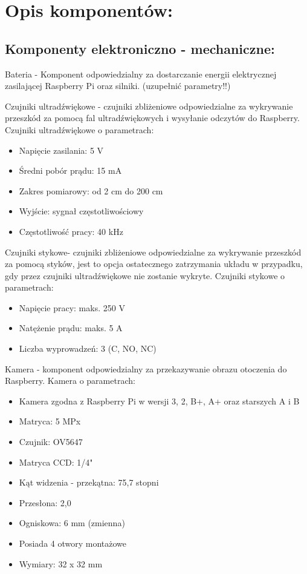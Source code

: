 \documentclass[a4paper]{article}
\begin{document}
\section{Opis komponentów:}

\subsection{Komponenty elektroniczno - mechaniczne:}


Bateria - Komponent odpowiedzialny za dostarczanie energii elektrycznej zasilającej Raspberry Pi oraz silniki. (uzupełnić parametry!!)


Czujniki ultradźwiękowe - czujniki zbliżeniowe odpowiedzialne za wykrywanie przeszkód za pomocą fal ultradźwiękowych i wysyłanie odczytów do Raspberry. Czujniki ultradźwiękowe o parametrach:
\begin{itemize}
\item Napięcie zasilania: 5 V
\item Średni pobór prądu: 15 mA
\item Zakres pomiarowy: od 2 cm do 200 cm
\item Wyjście: sygnał częstotliwościowy
\item Częstotliwość pracy: 40 kHz
\end{itemize}
Czujniki stykowe- czujniki zbliżeniowe odpowiedzialne za wykrywanie przeszkód za pomocą styków, jest to opcja ostatecznego zatrzymania układu w przypadku, gdy przez czujniki ultradźwiękowe nie zostanie wykryte. Czujniki stykowe o parametrach:
\begin{itemize}
\item Napięcie pracy: maks. 250 V
\item Natężenie prądu: maks. 5 A
\item Liczba wyprowadzeń: 3 (C, NO, NC)
\end{itemize}
Kamera - komponent odpowiedzialny za przekazywanie obrazu otoczenia do Raspberry. Kamera o parametrach:
\begin{itemize}
\item Kamera zgodna z Raspberry Pi w wersji 3, 2, B+, A+ oraz starszych A i B
\item Matryca: 5 MPx
\item Czujnik: OV5647
\item Matryca CCD: 1/4"
\item Kąt widzenia - przekątna: 75,7 stopni
\item Przesłona: 2,0
\item Ogniskowa: 6 mm (zmienna)
\item Posiada 4 otwory montażowe
\item Wymiary: 32 x 32 mm
\end{itemize}
\end{document}
